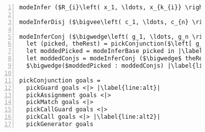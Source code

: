 


\begin{figure}[h]
  \centering
  \begin{minipage}{\columnwidth}
    \begin{lstlisting}[label={fig:modeInference},
                       caption={Mode inference pseudocode},
                       captionpos=b,
                       frame=tb, 
                       escapechar=|, 
                       numbers=left, 
                       numberstyle={\footnotesize}]
modeInfer ($R_{i}\left( x_1, \ldots, x_{k_{i}} \right) \equiv body$) = ($R_{i}\left( x_1, \ldots, x_{k_{i}} \right) \equiv$ (modeInferDisj body)) |\label{line:body}| 

modeInferDisj ($\bigvee\left( c_1, \ldots, c_{n} \right)$) = $\bigvee( $modeInferConj $ c_1, \ldots, $ modeInferConj $ c_{n})$ |\label{line:disj}| 

modeInferConj ($\bigwedge\left( g_1, \ldots, g_n \right)$) =
  let (picked, theRest) = pickConjunction($\left[ g_1, \ldots, g_n \right]$) in |\label{line:pick}| 
  let moddedPicked = modeInferBase picked in |\label{line:pick_analyze}| 
  let moddedConjs = modeInferConj ($\bigwedge$ theRest) in |\label{line:conj}| 
  $\bigwedge($moddedPicked : moddedConjs) |\label{line:result}|

pickConjunction goals =
  pickGuard goals <|> |\label{line:alt}|
  pickAssignment goals <|>
  pickMatch goals <|>
  pickCallGuard goals <|>
  pickCall goals <|> |\label{line:alt2}|
  pickGenerator goals
    \end{lstlisting}
  \end{minipage}
\end{figure}